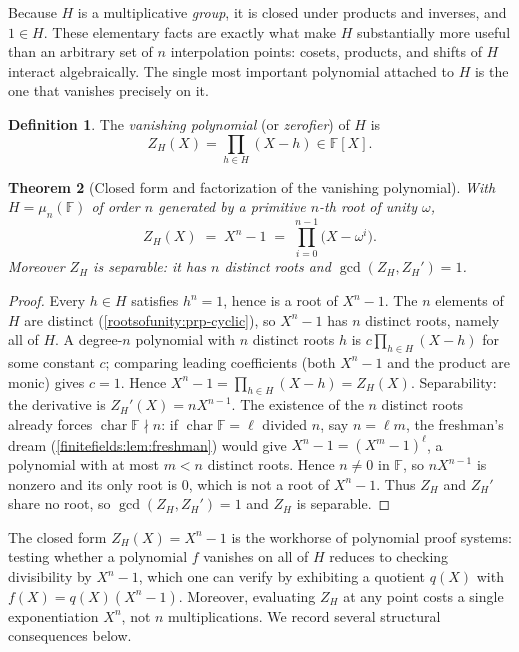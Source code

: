 \documentclass[11pt,a4paper]{article}
\newtheorem{theorem}{Theorem}[section]
\theoremstyle{definition}
\newtheorem{definition}[theorem]{Definition}
\theoremstyle{remark}
\newcommand{\F}{\ensuremath{\mathbb{F}}}
\begin{document}
Because \(H\) is a multiplicative \emph{group}, it is closed under products and inverses, and \(1 \in H\). These elementary facts are exactly what make \(H\) substantially more useful than an arbitrary set of \(n\) interpolation points: cosets, products, and shifts of \(H\) interact algebraically. The single most important polynomial attached to \(H\) is the one that vanishes precisely on it.

\begin{definition}\label{rootsofunity:def-vanishing}
The \emph{vanishing polynomial} (or \emph{zerofier}) of \(H\) is
\[
  Z_H(X) = \prod_{h \in H}(X - h) \in \F[X].
\]
\end{definition}

\begin{theorem}[Closed form and factorization of the vanishing polynomial]\label{rootsofunity:thm-vanishing}
With \(H = \mu_n(\F)\) of order \(n\) generated by a primitive \(n\)-th root of unity \(\omega\),
\[
  Z_H(X) \;=\; X^n - 1 \;=\; \prod_{i=0}^{n-1}\bigl(X - \omega^i\bigr).
\]
Moreover \(Z_H\) is separable: it has \(n\) distinct roots and \(\gcd(Z_H, Z_H') = 1\).
\end{theorem}

\begin{proof}
Every \(h \in H\) satisfies \(h^n = 1\), hence is a root of \(X^n - 1\). The \(n\) elements of \(H\) are distinct (\cref{rootsofunity:prp-cyclic}), so \(X^n - 1\) has \(n\) distinct roots, namely all of \(H\). A degree-\(n\) polynomial with \(n\) distinct roots \(h\) is \(c \prod_{h\in H}(X-h)\) for some constant \(c\); comparing leading coefficients (both \(X^n - 1\) and the product are monic) gives \(c = 1\). Hence \(X^n - 1 = \prod_{h\in H}(X-h) = Z_H(X)\). Separability: the derivative is \(Z_H'(X) = n X^{n-1}\). The existence of the \(n\) distinct roots already forces \(\operatorname{char}\F \nmid n\): if \(\operatorname{char}\F = \ell\) divided \(n\), say \(n = \ell m\), the freshman's dream (\cref{finitefields:lem:freshman}) would give \(X^n - 1 = (X^m - 1)^\ell\), a polynomial with at most \(m < n\) distinct roots. Hence \(n \ne 0\) in \(\F\), so \(n X^{n-1}\) is nonzero and its only root is \(0\), which is not a root of \(X^n - 1\). Thus \(Z_H\) and \(Z_H'\) share no root, so \(\gcd(Z_H, Z_H') = 1\) and \(Z_H\) is separable.
\end{proof}

The closed form \(Z_H(X) = X^n - 1\) is the workhorse of polynomial proof systems: testing whether a polynomial \(f\) vanishes on all of \(H\) reduces to checking divisibility by \(X^n - 1\), which one can verify by exhibiting a quotient \(q(X)\) with \(f(X) = q(X)(X^n-1)\). Moreover, evaluating \(Z_H\) at any point costs a single exponentiation \(X^n\), not \(n\) multiplications. We record several structural consequences below.
\end{document}
